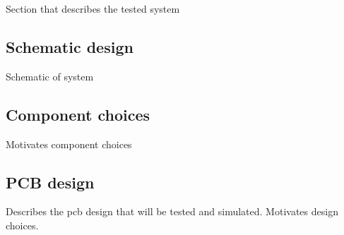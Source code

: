 Section that describes the tested system

\subsection{Schematic design}
Schematic of system

\subsection{Component choices}
Motivates component choices

\subsection{PCB design}
Describes the \gls{pcb} design that will be tested and simulated. Motivates design choices.